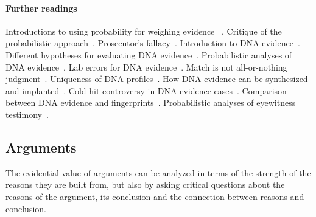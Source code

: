 \documentclass[10pt]{article}
\begin{document}


\paragraph{Further readings} Introductions to using probability for weighing evidence 
~\citep{finkelsteinFairley1970, dawid2002, morteraDawid2007}. Critique 
of the probabilistic approach~\citep{tribe1971, cohen1977, allenPardo2007}.
Prosecutor's fallacy~\citep{thompsonSchumann1987}.
Introduction to DNA evidence~\citep{wasserman2008, kayeSensabaugh2000}.
Different hypotheses for evaluating DNA evidence~\citep{koehler1993, cookEtAl1998, evettEtal2000}. 
Probabilistic analyses of DNA evidence~\citep{robertsonVignaux1995, buckleton2005, balding2005}. 
 Lab errors for DNA evidence~\citep{thompsonEtAl2003}. 
 Match is not all-or-nothing judgment~\citep{kaye1993}. 
Uniqueness of DNA profiles~\citep{kaye2013, weir2007}.
How DNA evidence can be synthesized and implanted~\citep{frumkinEtAl2009}. 
Cold hit controversy in DNA evidence cases~\citep{NRC1996, baldingDonnely1996}. 
Comparison between DNA evidence and fingerprints~\citep{zabell2005}. 
Probabilistic analyses of eyewitness testimony~\citep{friedman1987, schum1994, schumStarace2001}. 

\subsection{Arguments}
\label{sec:valueArgs}

The evidential value of arguments can be analyzed in terms of the strength 
of the reasons they are built from, but also by asking critical questions 
about the reasons of the argument, its conclusion and the connection 
between reasons and conclusion. 
\end{document}
